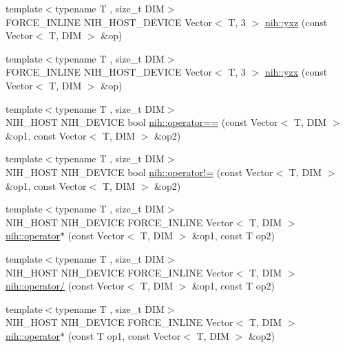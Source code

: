 \begin{DoxyCompactItemize}
{\footnotesize template$<$typename T , size\-\_\-t \-D\-I\-M$>$ }\\\-F\-O\-R\-C\-E\-\_\-\-I\-N\-L\-I\-N\-E \-N\-I\-H\-\_\-\-H\-O\-S\-T\-\_\-\-D\-E\-V\-I\-C\-E \*
\-Vector$<$ \-T, 3 $>$ \hyperlink{group__vectors_gaacc6c8319788b93e1cf61288299530ca}{nih\-::yxz} (const \-Vector$<$ \-T, \-D\-I\-M $>$ \&op)
\item 
{\footnotesize template$<$typename T , size\-\_\-t \-D\-I\-M$>$ }\\\-F\-O\-R\-C\-E\-\_\-\-I\-N\-L\-I\-N\-E \-N\-I\-H\-\_\-\-H\-O\-S\-T\-\_\-\-D\-E\-V\-I\-C\-E \*
\-Vector$<$ \-T, 3 $>$ \hyperlink{group__vectors_ga5bae4031dc463ce54993a932a5671a17}{nih\-::yzx} (const \-Vector$<$ \-T, \-D\-I\-M $>$ \&op)
\item 
{\footnotesize template$<$typename T , size\-\_\-t \-D\-I\-M$>$ }\\\-N\-I\-H\-\_\-\-H\-O\-S\-T \-N\-I\-H\-\_\-\-D\-E\-V\-I\-C\-E bool \hyperlink{group__vectors_gaabd17838f41c1637cb84a3cfe31dfb0b}{nih\-::operator==} (const \-Vector$<$ \-T, \-D\-I\-M $>$ \&op1, const \-Vector$<$ \-T, \-D\-I\-M $>$ \&op2)
\item 
{\footnotesize template$<$typename T , size\-\_\-t \-D\-I\-M$>$ }\\\-N\-I\-H\-\_\-\-H\-O\-S\-T \-N\-I\-H\-\_\-\-D\-E\-V\-I\-C\-E bool \hyperlink{group__vectors_ga884852dfe6e126e524af6c966fd3fa8e}{nih\-::operator!=} (const \-Vector$<$ \-T, \-D\-I\-M $>$ \&op1, const \-Vector$<$ \-T, \-D\-I\-M $>$ \&op2)
\item 
{\footnotesize template$<$typename T , size\-\_\-t \-D\-I\-M$>$ }\\\-N\-I\-H\-\_\-\-H\-O\-S\-T \-N\-I\-H\-\_\-\-D\-E\-V\-I\-C\-E \*
\-F\-O\-R\-C\-E\-\_\-\-I\-N\-L\-I\-N\-E \-Vector$<$ \-T, \-D\-I\-M $>$ \hyperlink{group__vectors_ga400f2fbe2094965df70010d98a05e1fc}{nih\-::operator$\ast$} (const \-Vector$<$ \-T, \-D\-I\-M $>$ \&op1, const \-T op2)
\item 
{\footnotesize template$<$typename T , size\-\_\-t \-D\-I\-M$>$ }\\\-N\-I\-H\-\_\-\-H\-O\-S\-T \-N\-I\-H\-\_\-\-D\-E\-V\-I\-C\-E \*
\-F\-O\-R\-C\-E\-\_\-\-I\-N\-L\-I\-N\-E \-Vector$<$ \-T, \-D\-I\-M $>$ \hyperlink{group__vectors_gafe00990ed787cec75b986c394b7f5e0f}{nih\-::operator/} (const \-Vector$<$ \-T, \-D\-I\-M $>$ \&op1, const \-T op2)
\item 
{\footnotesize template$<$typename T , size\-\_\-t \-D\-I\-M$>$ }\\\-N\-I\-H\-\_\-\-H\-O\-S\-T \-N\-I\-H\-\_\-\-D\-E\-V\-I\-C\-E \*
\-F\-O\-R\-C\-E\-\_\-\-I\-N\-L\-I\-N\-E \-Vector$<$ \-T, \-D\-I\-M $>$ \hyperlink{group__vectors_gaea85e6f752c95162ffe3388dd87d57d4}{nih\-::operator$\ast$} (const \-T op1, const \-Vector$<$ \-T, \-D\-I\-M $>$ \&op2)

\end{DoxyCompactItemize}
